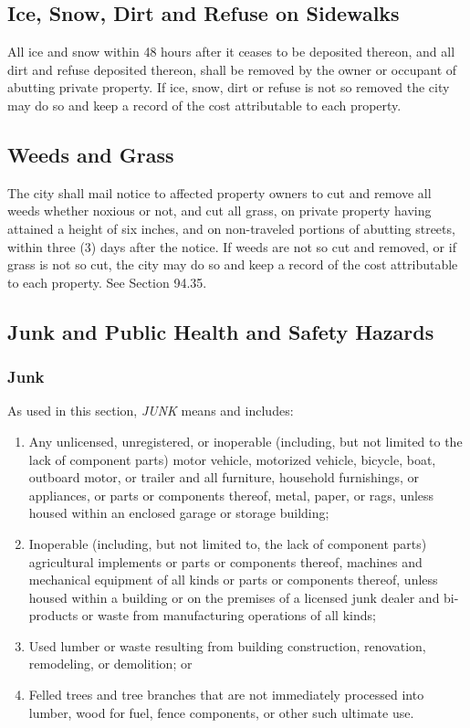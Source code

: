 \subsection{Ice, Snow, Dirt and Refuse on Sidewalks}
All ice and snow within 48 hours after it ceases to be deposited thereon, and all dirt and refuse deposited thereon, shall be removed by the owner or occupant of abutting private property.  If ice, snow, dirt or refuse is not so removed the city may do so and keep a record of the cost attributable to each property.
\subsection{Weeds and Grass}
The city shall mail notice to affected property owners to cut and remove all weeds whether noxious or not, and cut all grass, on private property having attained a height of six inches, and on non-traveled portions of abutting streets, within three (3) days after the notice. If weeds are not so cut and removed, or if grass is not so cut, the city may do so and keep a record of the cost attributable to each property. See Section 94.35.
\subsection{Junk and Public Health and Safety Hazards}
\subsubsection{Junk}  As used in this section, \emph{JUNK} means and includes:
\begin{enumerate}[{\indent}a)]
    \item Any unlicensed, unregistered, or inoperable (including, but not limited to the lack of component parts) motor vehicle, motorized vehicle, bicycle, boat, outboard motor, or trailer and all furniture, household furnishings, or appliances, or parts or components thereof, metal, paper, or rags, unless housed within an enclosed garage or storage building; 
    \item Inoperable (including, but not limited to, the lack of component parts) agricultural implements or parts or components thereof, machines and mechanical equipment of all kinds or parts or components thereof, unless housed within a building or on the premises of a licensed junk dealer and bi-products or waste from manufacturing operations of all kinds; 
    \item Used lumber or waste resulting from building construction, renovation, remodeling, or demolition; or 
    \item Felled trees and tree branches that are not immediately processed into lumber, wood for fuel, fence components, or other such ultimate use.
\end{enumerate}
